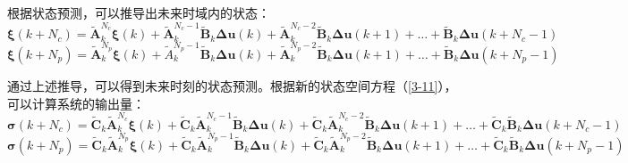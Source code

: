 \documentclass[lang=chs, degree=master, blindreview=true, winfonts=true]{yanputhesis}
\begin{document}
根据状态预测，可以推导出未来时域内的状态：
\begin{equation}
    \bm \xi(k + N_c) = \tilde{\bm A}_k^{N_c} \bm \xi(k) + \tilde{\bm A}_k^{N_c-1} \tilde{\bm B}_k \bm \Delta \bm u(k) + \tilde{\bm A}_k^{N_c-2} \bm \tilde{\bm B}_k \bm \Delta \bm u(k+1) + \dots + \tilde{\bm B}_k \bm \Delta \bm u(k + N_c - 1)
\end{equation}
\begin{equation}
    \bm \xi(k + N_p) = \tilde{\bm A}_k^{N_p} \bm \xi(k) + \tilde{A}_k^{N_p-1} \tilde{\bm B}_k \bm \Delta \bm u(k) + \tilde{\bm A}_k^{N_p-2} \tilde{\bm B}_k \bm \Delta \bm u(k+1) + \dots + \tilde{\bm B}_k \bm \Delta \bm u(k + N_p - 1)
\end{equation}

通过上述推导，可以得到未来时刻的状态预测。根据新的状态空间方程（\ref{3-11}），可以计算系统的输出量：
\begin{equation}
	\bm \sigma(k + N_c) = \tilde{\bm C}_k \tilde{\bm A}_k^{N_c} \bm \xi(k) + \tilde{\bm C}_k \tilde{\bm A}_k^{N_c-1} \tilde{\bm B}_k \bm \Delta \bm u(k) + \tilde{\bm C}_k \tilde{\bm A}_k^{N_c-2} \tilde{\bm B}_k \bm \Delta \bm u(k+1) + \dots + \tilde{\bm C}_k \tilde{\bm B}_k \bm \Delta \bm u(k + N_c - 1)
\end{equation}
\begin{equation}
	\bm  \sigma(k + N_p) = \tilde{\bm C}_k \tilde{\bm A}_k^{N_p}\bm  \xi(k) + \tilde{\bm C}_k \tilde{\bm A}_k^{N_p-1} \tilde{\bm B}_k \bm \Delta \bm u(k) + \tilde{\bm C}_k \tilde{\bm A}_k^{N_p-2} \tilde{\bm B}_k \bm \Delta \bm u(k+1) + \dots + \tilde{\bm C}_k \tilde{\bm B}_k \bm  \Delta \bm u(k + N_p - 1)
\end{equation}
\end{document}
